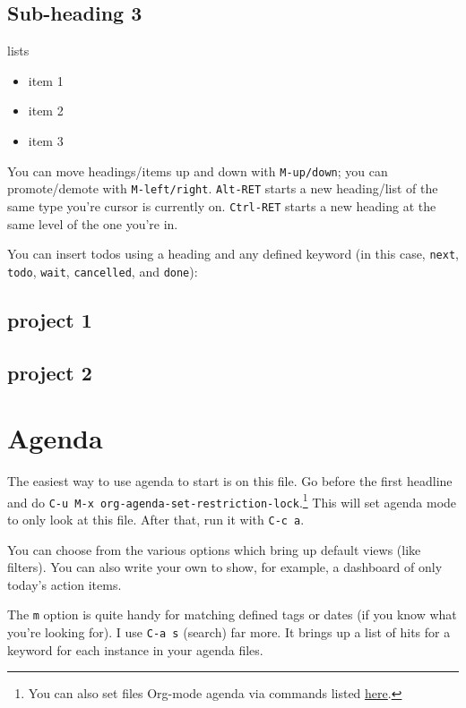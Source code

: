 \documentclass[11pt]{article}
\begin{document}
\subsection*{Sub-heading 3}
\label{sec:orgheadline5}

lists
\begin{itemize}
\item item 1
\item item 2
\item item 3
\end{itemize}

You can move headings/items up and down with \texttt{M-up/down}; you can promote/demote with
\texttt{M-left/right}. \texttt{Alt-RET} starts a new heading/list of the same type you're cursor is
currently on. \texttt{Ctrl-RET} starts a new heading at the same level of the one you're in.

You can insert todos using a heading and any defined keyword (in this case, \texttt{next}, \texttt{todo},
\texttt{wait}, \texttt{cancelled}, and \texttt{done}):

\subsection*{project 1}
\label{sec:orgheadline6}

\subsection*{project 2}
\label{sec:orgheadline7}

\section*{Agenda}
\label{sec:orgheadline9}

The easiest way to use agenda to start is on this file. Go before the first headline and
do \texttt{C-u M-x org-agenda-set-restriction-lock}.\footnote{You can also set files Org-mode agenda via commands listed \href{http://orgmode.org/manual/Agenda-files.html#Agenda-files}{here}.} This will set agenda mode to only look at
this file. After that, run it with \texttt{C-c a}.

You can choose from the various options which bring up default views (like filters). You
can also write your own to show, for example, a dashboard of only today's action items.

The \texttt{m} option is quite handy for matching defined tags or dates (if you know what you're
looking for). I use \texttt{C-a s} (search) far more. It brings up a list of hits for a keyword
for each instance in your agenda files.
\end{document}
